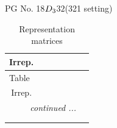 \documentclass[fleqn,8pt,landscape]{jsarticle}
\begin{document}
\setcounter{MaxMatrixCols}{32}

\renewcommand{\tablename}{Table~}
\renewcommand{\figurename}{Figure~}
\begin{center}
\LARGE
PG No. 18\quad$D_{\rm 3}$\quad$32$\quad(321 setting)\quad[ trigonal ]
\end{center}
\renewcommand{\arraystretch}{1.2}
\begin{longtable}{ccccccc}
\caption{Representation matrices}
 \\
 \hline \hline
Irrep. &  &  &  &  &  &  \\ \hline \endfirsthead

\multicolumn{6}{l}{\tablename\ \thetable{}} \\
 \hline \hline
Irrep. &  &  &  &  &  &  \\ \hline \endhead

 \hline \hline
\multicolumn{6}{r}{\footnotesize\it continued ...} \\ \endfoot

 \hline \hline
\multicolumn{6}{r}{} \\ \endlastfoot


\end{longtable}
\end{document}

